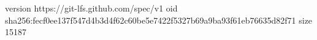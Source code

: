 version https://git-lfs.github.com/spec/v1
oid sha256:fecf0ee137f547d4b3d4f62c60be5e7422f5327b69a9ba93f61eb76635d82f71
size 15187
